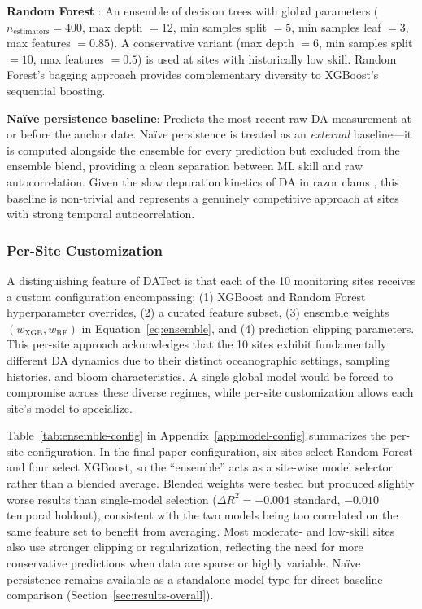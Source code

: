\documentclass[toxins,article,submit,moreauthors]{Definitions/mdpi}
\begin{document}
\textbf{Random Forest} \cite{Breiman2001}: An ensemble of decision trees with global parameters ($n_{\text{estimators}} = 400$, max depth $= 12$, min samples split $= 5$, min samples leaf $= 3$, max features $= 0.85$). A conservative variant (max depth $= 6$, min samples split $= 10$, max features $= 0.5$) is used at sites with historically low skill. Random Forest's bagging approach provides complementary diversity to XGBoost's sequential boosting.

\textbf{Na\"ive persistence baseline}: Predicts the most recent raw DA measurement at or before the anchor date. Na\"ive persistence is treated as an \textit{external} baseline---it is computed alongside the ensemble for every prediction but excluded from the ensemble blend, providing a clean separation between ML skill and raw autocorrelation. Given the slow depuration kinetics of DA in razor clams \cite{Drum1993}, this baseline is non-trivial and represents a genuinely competitive approach at sites with strong temporal autocorrelation.

\subsubsection{Per-Site Customization}

A distinguishing feature of DATect is that each of the 10 monitoring sites receives a custom configuration encompassing: (1) XGBoost and Random Forest hyperparameter overrides, (2) a curated feature subset, (3) ensemble weights $(w_{\text{XGB}}, w_{\text{RF}})$ in Equation~\eqref{eq:ensemble}, and (4) prediction clipping parameters. This per-site approach acknowledges that the 10 sites exhibit fundamentally different DA dynamics due to their distinct oceanographic settings, sampling histories, and bloom characteristics. A single global model would be forced to compromise across these diverse regimes, while per-site customization allows each site's model to specialize.

Table~\ref{tab:ensemble-config} in Appendix~\ref{app:model-config} summarizes the per-site configuration. In the final paper configuration, six sites select Random Forest and four select XGBoost, so the ``ensemble'' acts as a site-wise model selector rather than a blended average. Blended weights were tested but produced slightly worse results than single-model selection ($\Delta R^2 = -0.004$ standard, $-0.010$ temporal holdout), consistent with the two models being too correlated on the same feature set to benefit from averaging. Most moderate- and low-skill sites also use stronger clipping or regularization, reflecting the need for more conservative predictions when data are sparse or highly variable. Na\"ive persistence remains available as a standalone model type for direct baseline comparison (Section~\ref{sec:results-overall}).
\end{document}
